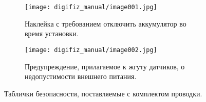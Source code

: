 \begin{figure}[htbp]
    \centering
    \begin{subfigure}{0.46\textwidth}
        \texttt{[image: digifiz\_manual/image001.jpg]}
        \caption{Наклейка с требованием отключить аккумулятор во время установки.}
    \end{subfigure}\hfill
    \begin{subfigure}{0.46\textwidth}
        \texttt{[image: digifiz\_manual/image002.jpg]}
        \caption{Предупреждение, прилагаемое к жгуту датчиков, о недопустимости внешнего питания.}
    \end{subfigure}
    \caption{Таблички безопасности, поставляемые с комплектом проводки.}
\end{figure}
